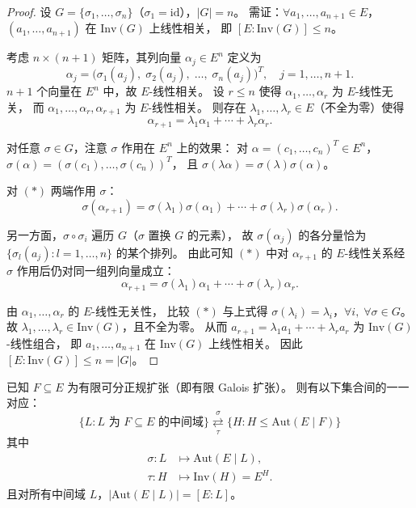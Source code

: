 \documentclass[lang=cn,a4paper,newtx]{elegantbook}
\begin{document}
\begin{proof}
  设 $G=\{\sigma_1,\dots,\sigma_n\}$（$\sigma_1=\mathrm{id}$），$|G|=n$。
  需证：$\forall a_1,\dots,a_{n+1}\in E$，$(a_1,\dots,a_{n+1})$ 在 $\mathrm{Inv}(G)$ 上线性相关，
  即 $[E:\mathrm{Inv}(G)]\le n$。

  考虑 $n\times(n+1)$ 矩阵，其列向量 $\alpha_j\in E^n$ 定义为
  \[
    \alpha_j=\bigl(\sigma_1(a_j),\;\sigma_2(a_j),\;\dots,\;\sigma_n(a_j)\bigr)^T,\quad j=1,\dots,n+1.
  \]
  $n+1$ 个向量在 $E^n$ 中，故 $E$-线性相关。
  设 $r\le n$ 使得 $\alpha_1,\dots,\alpha_r$ 为 $E$-线性无关，
  而 $\alpha_1,\dots,\alpha_r,\alpha_{r+1}$ 为 $E$-线性相关。
  则存在 $\lambda_1,\dots,\lambda_r\in E$（不全为零）使得
  \begin{equation}\tag{$*$}
    \alpha_{r+1}=\lambda_1\alpha_1+\cdots+\lambda_r\alpha_r.
  \end{equation}

  对任意 $\sigma\in G$，注意 $\sigma$ 作用在 $E^n$ 上的效果：
  对 $\alpha=(c_1,\dots,c_n)^T\in E^n$，$\sigma(\alpha)=(\sigma(c_1),\dots,\sigma(c_n))^T$，
  且 $\sigma(\lambda\alpha)=\sigma(\lambda)\sigma(\alpha)$。

  对 $(*)$ 两端作用 $\sigma$：
  \begin{equation}\tag{$**$}
    \sigma(\alpha_{r+1})=\sigma(\lambda_1)\sigma(\alpha_1)+\cdots+\sigma(\lambda_r)\sigma(\alpha_r).
  \end{equation}

  另一方面，$\sigma\circ\sigma_i$ 遍历 $G$（$\sigma$ 置换 $G$ 的元素），
  故 $\sigma(\alpha_j)$ 的各分量恰为 $\{\sigma_l(a_j):l=1,\dots,n\}$ 的某个排列。
  由此可知 $(*)$ 中对 $\alpha_{r+1}$ 的 $E$-线性关系经 $\sigma$ 作用后仍对同一组列向量成立：
  \[
    \alpha_{r+1}=\sigma(\lambda_1)\alpha_1+\cdots+\sigma(\lambda_r)\alpha_r.
  \]

  由 $\alpha_1,\dots,\alpha_r$ 的 $E$-线性无关性，
  比较 $(*)$ 与上式得 $\sigma(\lambda_i)=\lambda_i$，$\forall i,\;\forall\sigma\in G$。
  故 $\lambda_1,\dots,\lambda_r\in\mathrm{Inv}(G)$，且不全为零。
  从而 $a_{r+1}=\lambda_1 a_1+\cdots+\lambda_r a_r$ 为 $\mathrm{Inv}(G)$-线性组合，
  即 $a_1,\dots,a_{n+1}$ 在 $\mathrm{Inv}(G)$ 上线性相关。
  因此 $[E:\mathrm{Inv}(G)]\le n=|G|$。
\end{proof}

\begin{theorem}
  已知 $F\subseteq E$ 为有限可分正规扩张（即有限 Galois 扩张）。
  则有以下集合间的一一对应：
  \[
    \{L:L\text{ 为 }F\subseteq E\text{ 的中间域}\}
    \overset{\sigma}{\underset{\tau}{\rightleftarrows}}
    \{H:H\le\mathrm{Aut}(E\mid F)\}
  \]
  其中
  \begin{align*}
    \sigma\colon L&\longmapsto\mathrm{Aut}(E\mid L),\\
    \tau\colon H&\longmapsto\mathrm{Inv}(H)=E^H.
  \end{align*}
  且对所有中间域 $L$，$|\mathrm{Aut}(E\mid L)|=[E:L]$。
\end{theorem}
\end{document}

